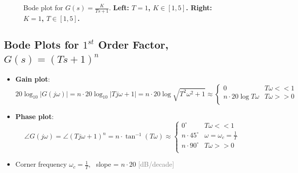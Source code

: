 \documentclass[12pt,a4paper]{article}
\begin{document}
\begin{itemize}
\begin{figure}[H]
\begin{minipage}{.5\textwidth}
\begin{figure}[H]
\end{figure}
\end{minipage}
\caption{Bode plot for $G(s) = \frac{K}{Ts+1}$. \textbf{Left: $T=1$, $K\in [1,5]$. Right: $K=1$, $T\in [1,5]$.}}
\end{figure}
\end{itemize}

\subsection{Bode Plots for $1^{st}$ Order Factor, $G(s) = (Ts+1)^{n}$}
\begin{itemize}
\item \textbf{Gain plot}:
\[20\log_{10}\lvert G(j\omega) \rvert  = n\cdot 20\log_{10} \lvert Tj\omega+1 \rvert =n\cdot20\log\sqrt{T^{2}\omega^{2}+1}\approx \begin{cases}
0 & T\omega<<1\\
n\cdot 20\log T\omega & T\omega>>0\\
\end{cases}\]
\item \textbf{Phase plot}:
\[\angle G(j\omega) = \angle (Tj\omega+1)^{n} = n\cdot \tan^{-1}(T\omega) \approx \begin{cases}
0^{\circ} & T\omega<<1\\
n\cdot 45^{\circ}& \omega=\omega_{c}=\frac{1}{T}\\
n\cdot 90^{\circ}& T\omega>>0\\
\end{cases}\]
\item Corner frequency $\omega_{c} = \frac{1}{T}$, \ slope = $n\cdot 20$ \textcolor{gray}{[dB/decade]}
\end{itemize}
\vspace{-1cm}
\end{document}
